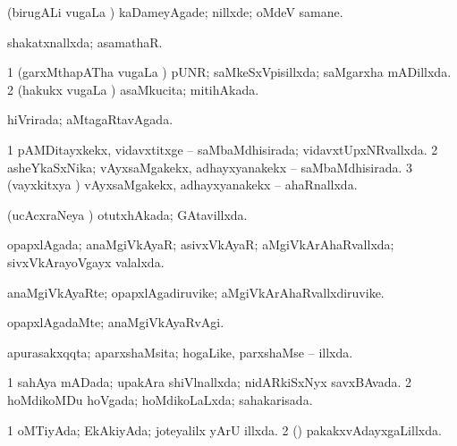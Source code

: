 {\bentry
{} 
\gl{\kirxvi}
\expl{}
\bmng
(birugALi \mo vugaLa \vi) kaDameyAgade; nillxde; oMdeV samane. 
\emng
\eentry

\bentry
{} 
\gl{\gu}
\expl{}
\bmng
shakatxnallxda; asamathaR. 
\emng
\eentry

\bentry
{} 
\gl{\gu}
\expl{}
\bmng
\bnum
\num{1} (garxMthapATha \mo vugaLa \vi) pUNR; saMkeSxVpisillxda; saMgarxha mADillxda. 
\num{2} (hakukx \mo vugaLa \vi) asaMkucita; mitihAkada. 
\enum
\emng
\eentry

\bentry
{} 
\gl{\gu}
\expl{}
\bmng
hiVrirada; aMtagaRtavAgada. 
\emng
\eentry

\bentry
{} 
\gl{\gu}
\expl{}
\bmng
\bnum
\num{1} pAMDitayxkekx, vidavxtitxge -- saMbaMdhisirada; vidavxtUpxNRvallxda. 
\num{2} asheYkaSxNika; vAyxsaMgakekx, adhayxyanakekx -- saMbaMdhisirada. 
\num{3} (vayxkitxya \vi) vAyxsaMgakekx, adhayxyanakekx -- ahaRnallxda. 
\enum
\emng
\eentry

\bentry
{} 
\gl{\gu}
\expl{}
\bmng
(ucAcxraNeya \vi) otutxhAkada; GAtavillxda. 
\emng
\eentry

\bentry
{} 
\gl{\gu}
\expl{}
\bmng
opapxlAgada; anaMgiVkAyaR; asivxVkAyaR; aMgiVkArAhaRvallxda; sivxVkArayoVgayx valalxda. 
\emng
\eentry

\bentry
{} 
\gl{\nA}
\expl{}
\bmng
anaMgiVkAyaRte; opapxlAgadiruvike; aMgiVkArAhaRvallxdiruvike. 
\emng
\eentry

\bentry
{} 
\gl{\kirxvi}
\expl{}
\bmng
opapxlAgadaMte; anaMgiVkAyaRvAgi. 
\emng
\eentry

\bentry
{} 
\gl{\gu}
\expl{}
\bmng
apurasakxqqta; aparxshaMsita; hogaLike, parxshaMse -- illxda. 
\emng
\eentry

\bentry
{} 
\gl{\gu}
\expl{}
\bmng
\bnum
\num{1} sahAya mADada; upakAra shiVlnallxda; nidARkiSxNyx savxBAvada. 
\num{2} hoMdikoMDu hoVgada; hoMdikoLaLxda; sahakarisada. 
\enum
\emng
\eentry

\bentry
{} 
\gl{\gu}
\expl{}
\bmng
\bnum
\num{1} oMTiyAda; EkAkiyAda; joteyalilx yArU illxda. 
\num{2} (\saM) pakakxvAdayxgaLillxda. 
\enum
\emng
\eentry

}
